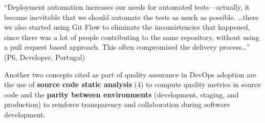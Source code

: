 \begin{mq}
  ``Deployment automation increases our
  needs for automated tests---actually, it became inevitable
  that we should automate the tests as much as possible. \ldots there we
  also started using Git Flow to eliminate the inconsistencies that
  happened, since there was a lot of people contributing
  to the same repository, without using a pull request based approach. 
  This often compromised the delivery process\ldots'' (P6, Developer, Portugal)
\end{mq}

Another two concepts cited as part of quality assurance in DevOps adoption are
the use of \textbf{source code static analysis} (4) to compute quality metrics in
source code and the \textbf{parity between environments} (development, staging,
and production) to reinforce transparency and collaboration during software
development.
